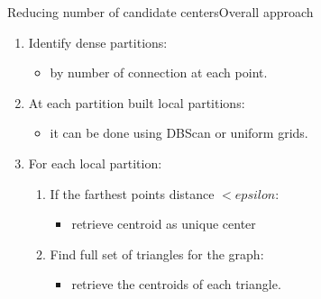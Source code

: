 \documentclass{beamer}
\begin{document}
\begin{frame}{Reducing number of candidate centers}{Overall approach}
    \begin{enumerate}
        \item Identify dense partitions:
        \begin{itemize}
            \item by number of connection at each point.
        \end{itemize}
        \item At each partition built local partitions:
        \begin{itemize}
            \item it can be done using DBScan or uniform grids.
        \end{itemize}
        \item For each local partition:
        \begin{enumerate}
            \item  If the farthest points distance $< epsilon$:
            \begin{itemize}
                \item retrieve centroid as unique center
            \end{itemize}
            \item  Find full set of triangles for the graph:
            \begin{itemize}
                \item retrieve the centroids of each triangle.
            \end{itemize}
        \end{enumerate}

    \end{enumerate}
\end{frame}
\end{document}
